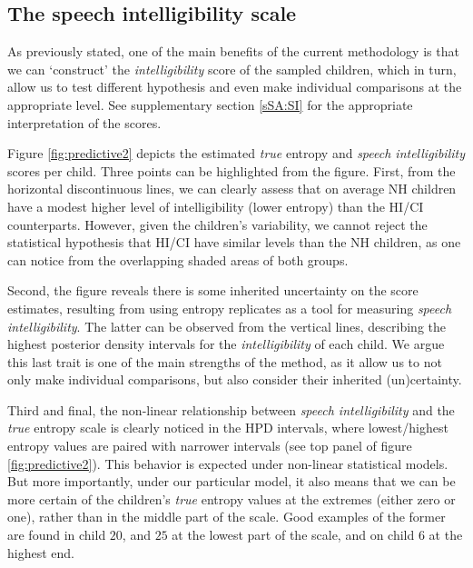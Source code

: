 \subsection{The speech intelligibility scale} \label{sS:results_scales}
%
As previously stated, one of the main benefits of the current methodology is that we can `construct' the \textit{intelligibility} score of the sampled children, which in turn, allow us to test different hypothesis and even make individual comparisons at the appropriate level. See supplementary section \ref{sSA:SI} for the appropriate interpretation of the scores.

Figure \ref{fig:predictive2} depicts the estimated \textit{true} entropy and \textit{speech intelligibility} scores per child. Three points can be highlighted from the figure. First, from the horizontal discontinuous lines, we can clearly assess that on average NH children have a modest higher level of intelligibility (lower entropy) than the HI/CI counterparts. However, given the children's variability, we cannot reject the statistical hypothesis that HI/CI have similar levels than the NH children, as one can notice from the overlapping shaded areas of both groups. 

Second, the figure reveals there is some inherited uncertainty on the score estimates, resulting from using entropy replicates as a tool for measuring \textit{speech intelligibility}. The latter can be observed from the vertical lines, describing the highest posterior density intervals for the \textit{intelligibility} of each child. We argue this last trait is one of the main strengths of the method, as it allow us to not only make individual comparisons, but also consider their inherited (un)certainty.

Third and final, the non-linear relationship between \textit{speech intelligibility} and the \textit{true} entropy scale is clearly noticed in the HPD intervals, where lowest/highest entropy values are paired with narrower intervals (see top panel of figure \ref{fig:predictive2}). This behavior is expected under non-linear statistical models. But more importantly, under our particular model, it also  means that we can be more certain of the children's \textit{true} entropy values at the extremes (either zero or one), rather than in the middle part of the scale. Good examples of the former are found in child $20$, and $25$ at the lowest part of the scale, and on child $6$ at the highest end.
%
%
